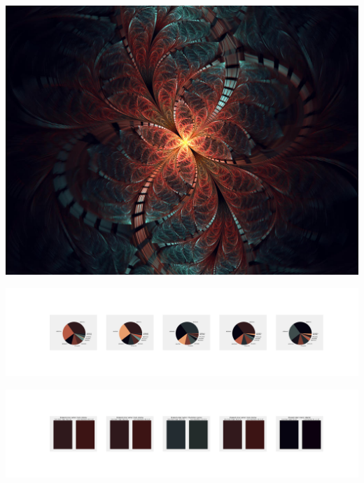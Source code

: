 \documentclass[11pt]{article}
\begin{document}
\begin{landscape}
    \begin{center}
    \includegraphics[width=\textwidth]{./nbimg/file (259).jpg}
    \end{center}

    \begin{center}
    \includegraphics[width=250mm]{./nbimg/pie-177.jpg}
    \end{center}

    \begin{center}
    \includegraphics[width=250mm]{./nbimg/peak-177.jpg}
    \end{center}
    


\end{landscape}
\end{document}
